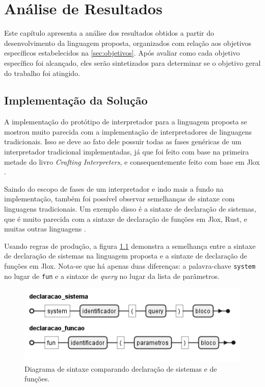 \chapter{Análise de Resultados} \label{ch:analise_resultados}

Este capítulo apresenta a análise dos resultados obtidos a partir do desenvolvimento da linguagem proposta, organizados com relação aos objetivos específicos estabelecidos na \autoref{sec:objetivos}. Após avaliar como cada objetivo específico foi alcançado, eles serão sintetizados para determinar se o objetivo geral do trabalho foi atingido.

\section{Implementação da Solução}

A implementação do protótipo de interpretador para a linguagem proposta se mostrou muito parecida com a implementação de interpretadores de linguagens tradicionais. Isso se deve ao fato dele possuir todas as fases genéricas de um interpretador tradicional implementadas, já que foi feito com base na primeira metade do livro \textit{Crafting Interpreters}, e consequentemente feito com base em Jlox \cite{craftinginterpreters}.

Saindo do escopo de fases de um interpretador e indo mais a fundo na implementação, também foi possível observar semelhanças de sintaxe com linguagens tradicionais. Um exemplo disso é a sintaxe de declaração de sistemas, que é muito parecida com a sintaxe de declaração de funções em Jlox, Rust, e muitas outras linguagens \cite{rustbook,craftinginterpreters}.

Usando regras de produção, a figura \ref{fig:decl_sistema_funcao} demonstra a semelhança entre a sintaxe de declaração de sistemas na linguagem proposta e a sintaxe de declaração de funções em Jlox. Nota-se que há apenas duas diferenças: a palavra-chave \texttt{system} no lugar de \texttt{fun} e a sintaxe de \textit{query} no lugar da lista de parâmetros.

\begin{figure}[H]
	\centering
	\includegraphics[width=0.45\textheight]{../diagrams/decl_sistema_funcao.png}
	\caption{Diagrama de sintaxe comparando declaração de sistemas e de funções.}
	\label{fig:decl_sistema_funcao}
\end{figure}

